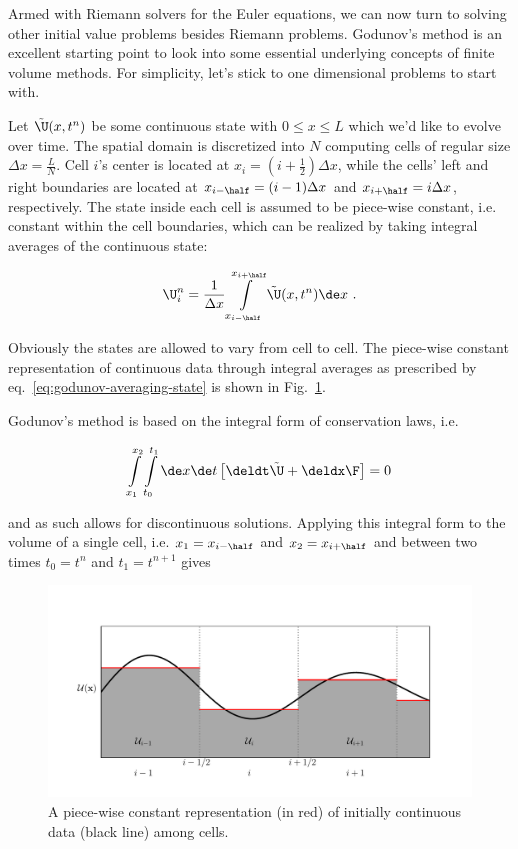 Armed with Riemann solvers for the Euler equations, we can now turn to solving other initial
value problems besides Riemann problems. Godunov's method is an excellent starting point to look
into some essential underlying concepts of finite volume methods. For simplicity, let's stick to
one dimensional problems to start with.


Let $\tilde{\U}(x, t^n)$ be some continuous state with $0 \leq x \leq L$ which we'd
like to evolve over time. The spatial domain is discretized into $N$ computing cells of regular
size $\Delta x = \tfrac{L}{N}$. Cell $i$'s center is located at $x_i = (i + \tfrac{1}{2}) \Delta
x$, while the cells' left and right boundaries are located at $x_{i - \half} = (i - 1) \Delta x$
and $x_{i+\half} = i\Delta x$, respectively. The state inside each cell is assumed to be piece-wise
constant, i.e. constant within the cell boundaries, which can be realized by taking integral
averages of the continuous state:

\begin{align}
    \U_i^n = \frac{1}{\Delta x} \int\limits_{x_{i-\half}}^{x_{i+\half}} \tilde{\U}(x, t^n) \de x \ .
\label{eq:godunov-averaging-state}
\end{align}

Obviously the states are allowed to vary from cell to cell. The piece-wise constant representation of
continuous data through integral averages as prescribed by eq.~\ref{eq:godunov-averaging-state} is
shown in  Fig.~\ref{fig:piecewise-constant}.

Godunov's method is based on the integral form of conservation laws, i.e.

\begin{align}
 \int\limits_{x_1}^{x_2} \int\limits_{t_0}^{t_1} \de x \de t \left[ \deldt \tilde{\U} + \deldx \F
\right] = 0
\end{align}

and as such allows for discontinuous solutions. Applying this integral form to the volume of a
single cell, i.e. $x_1 = x_{i-\half}$ and $x_2 = x_{i+\half}$ and between two times $t_0 = t^n$ and
$t_1 = t^{n+1}$ gives


\begin{figure}
    \includegraphics[width=\textwidth]{./figures/FV/piecewise_const.pdf}%
    \caption[A piece-wise constant representation of continuous data among cells.]
    {
A piece-wise constant representation (in red) of initially continuous data (black line)
among cells.
    }
\label{fig:piecewise-constant}
\end{figure}


